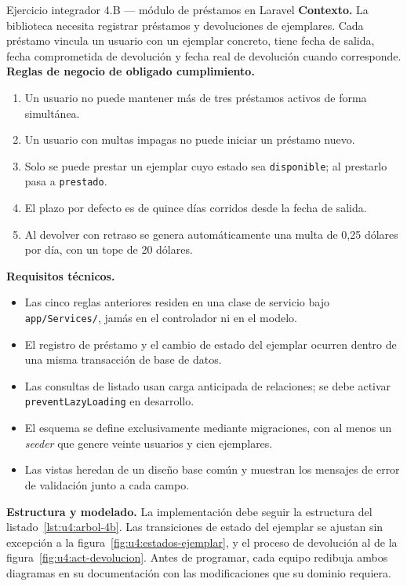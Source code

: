 \documentclass[11pt,a4paper,openany]{book}
\begin{document}
\begin{cajaejercicio}{Ejercicio integrador 4.B --- módulo de préstamos en Laravel}
	\textbf{Contexto.} La biblioteca necesita registrar préstamos y devoluciones de ejemplares. Cada préstamo vincula un usuario con un ejemplar concreto, tiene fecha de salida, fecha comprometida de devolución y fecha real de devolución cuando corresponde.\\[4pt]
	\textbf{Reglas de negocio de obligado cumplimiento.}
	\begin{enumerate}
		\item Un usuario no puede mantener más de tres préstamos activos de forma simultánea.
		\item Un usuario con multas impagas no puede iniciar un préstamo nuevo.
		\item Solo se puede prestar un ejemplar cuyo estado sea \texttt{disponible}; al prestarlo pasa a \texttt{prestado}.
		\item El plazo por defecto es de quince días corridos desde la fecha de salida.
		\item Al devolver con retraso se genera automáticamente una multa de 0,25 dólares por día, con un tope de 20 dólares.
	\end{enumerate}
	\textbf{Requisitos técnicos.}
	\begin{itemize}
		\item Las cinco reglas anteriores residen en una clase de servicio bajo \texttt{app/Services/}, jamás en el controlador ni en el modelo.
		\item El registro de préstamo y el cambio de estado del ejemplar ocurren dentro de una misma transacción de base de datos.
		\item Las consultas de listado usan carga anticipada de relaciones; se debe activar \texttt{preventLazyLoading} en desarrollo.
		\item El esquema se define exclusivamente mediante migraciones, con al menos un \emph{seeder} que genere veinte usuarios y cien ejemplares.
		\item Las vistas heredan de un diseño base común y muestran los mensajes de error de validación junto a cada campo.
	\end{itemize}
	\textbf{Estructura y modelado.} La implementación debe seguir la estructura del listado~\ref{lst:u4:arbol-4b}. Las transiciones de estado del ejemplar se ajustan sin excepción a la figura~\ref{fig:u4:estados-ejemplar}, y el proceso de devolución al de la figura~\ref{fig:u4:act-devolucion}. Antes de programar, cada equipo redibuja ambos diagramas en su documentación con las modificaciones que su dominio requiera.\\[4pt]

\end{cajaejercicio}
\end{document}
